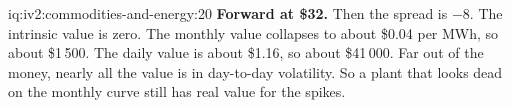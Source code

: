 \begin{solution}{iq:iv2:commodities-and-energy:20}
\textbf{Forward at \$32.} Then the spread is $-8$. The intrinsic value is zero. The monthly value collapses to about \$0.04 per MWh, so about \$1\,500. The daily value is about \$1.16, so about \$41\,000. Far out of the money, nearly all the value is in day-to-day volatility. So a plant that looks dead on the monthly curve still has real value for the spikes.

\end{solution}
